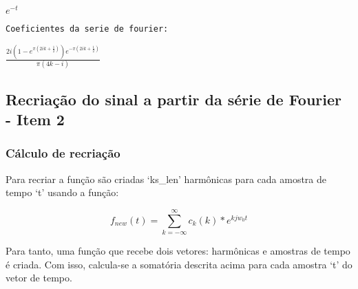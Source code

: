 \documentclass[11pt]{article}
\begin{document}
    $\displaystyle e^{- t}$

    
    \begin{Verbatim}[commandchars=\\\{\}]
Coeficientes da serie de fourier:
    \end{Verbatim}

    $\displaystyle \frac{2 i \left(1 - e^{\pi \left(2 i k + \frac{1}{2}\right)}\right) e^{- \pi \left(2 i k + \frac{1}{2}\right)}}{\pi \left(4 k - i\right)}$

    
    \hypertarget{recriauxe7uxe3o-do-sinal-a-partir-da-suxe9rie-de-fourier---item-2}{%
\subsection{Recriação do sinal a partir da série de Fourier - Item
2}\label{recriauxe7uxe3o-do-sinal-a-partir-da-suxe9rie-de-fourier---item-2}}

    \hypertarget{cuxe1lculo-de-recriauxe7uxe3o}{%
\subsubsection{Cálculo de
recriação}\label{cuxe1lculo-de-recriauxe7uxe3o}}

Para recriar a função são criadas `ks\_len' harmônicas para cada amostra
de tempo `t' usando a função:

\[ 
f_{new}(t) =
\sum_{k = -\infty}^{\infty}
c_k(k) * e^{k j w_0 t}
\]

Para tanto, uma função que recebe dois vetores: harmônicas e amostras de
tempo é criada. Com isso, calcula-se a somatória descrita acima para
cada amostra `t' do vetor de tempo.
\end{document}
